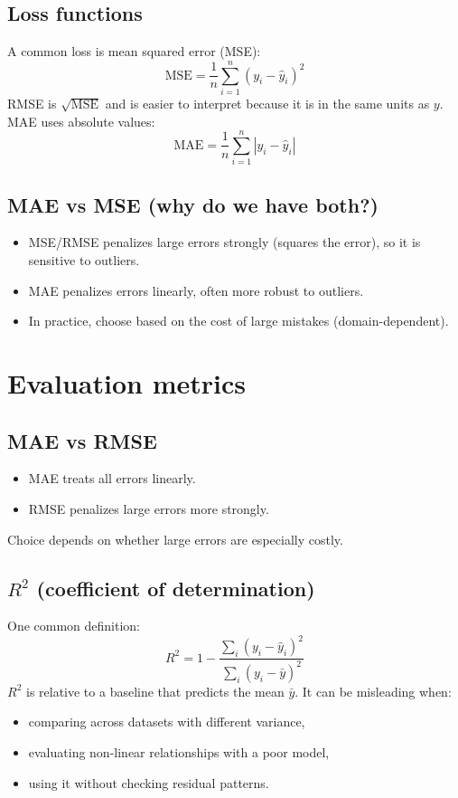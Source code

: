 \documentclass[11pt]{article}
\begin{document}
\subsection{Loss functions}
A common loss is mean squared error (MSE):
\[
  \text{MSE} = \frac{1}{n}\sum_{i=1}^{n}(y_i - \hat{y}_i)^2
\]
RMSE is $\sqrt{\text{MSE}}$ and is easier to interpret because it is in the same units as $y$.
MAE uses absolute values:
\[
  \text{MAE} = \frac{1}{n}\sum_{i=1}^{n}|y_i - \hat{y}_i|
\]

\subsection{MAE vs MSE (why do we have both?)}
\begin{itemize}[leftmargin=*]
  \item MSE/RMSE penalizes large errors strongly (squares the error), so it is sensitive to outliers.
  \item MAE penalizes errors linearly, often more robust to outliers.
  \item In practice, choose based on the cost of large mistakes (domain-dependent).
\end{itemize}

\section{Evaluation metrics}
\subsection{MAE vs RMSE}
\begin{itemize}[leftmargin=*]
  \item MAE treats all errors linearly.
  \item RMSE penalizes large errors more strongly.
\end{itemize}
Choice depends on whether large errors are especially costly.

\subsection{$R^2$ (coefficient of determination)}
One common definition:
\[
  R^2 = 1 - \frac{\sum_i (y_i-\hat{y}_i)^2}{\sum_i (y_i-\bar{y})^2}
\]
$R^2$ is relative to a baseline that predicts the mean $\bar{y}$.
It can be misleading when:
\begin{itemize}[leftmargin=*]
  \item comparing across datasets with different variance,
  \item evaluating non-linear relationships with a poor model,
  \item using it without checking residual patterns.
\end{itemize}
\end{document}
